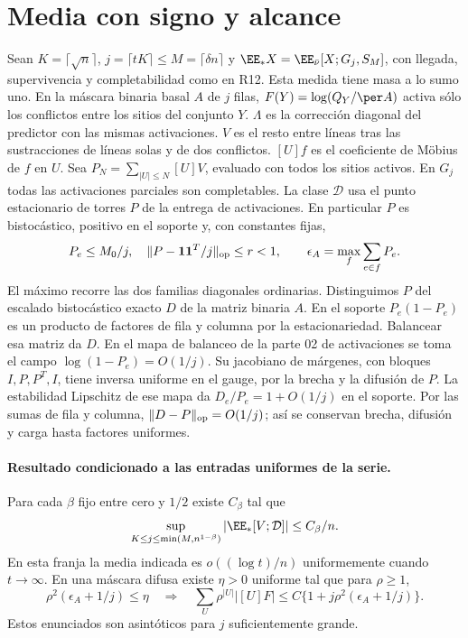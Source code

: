 \section{Media con signo y alcance}
Sean $K=\lceil\sqrt n\rceil$, $j=\lceil tK\rceil\le M=\lceil\delta n\rceil$ y
$\EE_*X=\EE_{\bar\nu}[X;G_j,S_M]$, con llegada, supervivencia y completabilidad como en R12.
Esta medida tiene masa a lo sumo uno. En la máscara binaria basal $A$ de $j$ filas,
$F(Y)=\log(Q_Y/\per A)$ activa sólo los conflictos entre los sitios del conjunto $Y$.
$\Lambda$ es la corrección diagonal del predictor con las mismas activaciones.
$V$ es el resto entre líneas tras las sustracciones de líneas solas y de dos conflictos.
$[U]f$ es el coeficiente de Möbius de $f$ en $U$. Sea
$P_N=\sum_{|U|\le N}[U]V$, evaluado con todos los sitios activos.
En $G_j$ todas las activaciones parciales son completables.
La clase $\mathcal D$ usa el punto estacionario de torres $P$ de la entrega de activaciones.
En particular $P$ es bistocástico, positivo en el soporte y, con constantes fijas,
\[
 P_e\le M_0/j,\quad \|P-\mathbf1\mathbf1^T/j\|_{\rm op}\le r<1,\qquad
 \epsilon_A=\max_f\sum_{e\in f}P_e .
\]
El máximo recorre las dos familias diagonales ordinarias. Distinguimos $P$ del escalado
bistocástico exacto $D$ de la matriz binaria $A$. En el soporte $P_e(1-P_e)$ es un
producto de factores de fila y columna por la estacionariedad. Balancear esa matriz da
$D$. En el mapa de balanceo de la parte 02 de activaciones se toma el campo
$\log(1-P_e)=O(1/j)$. Su jacobiano de márgenes, con bloques $I,P,P^T,I$, tiene inversa
uniforme en el gauge, por la brecha y la difusión de $P$. La estabilidad Lipschitz
de ese mapa da $D_e/P_e=1+O(1/j)$ en el soporte. Por las sumas de fila y columna,
$\|D-P\|_{\rm op}=O(1/j)$; así se conservan brecha, difusión y carga hasta factores uniformes.
\paragraph{Resultado condicionado a las entradas uniformes de la serie.}
Para cada $\beta$ fijo entre cero y $1/2$ existe $C_\beta$ tal que
\[
 \sup_{K\le j\le \min(M,n^{1-\beta})}|\EE_*[V;\mathcal D]|\le C_\beta/n .
\]
En esta franja la media indicada es $o((\log t)/n)$ uniformemente cuando $t\to\infty$.
En una máscara difusa existe $\eta>0$ uniforme tal que para $\rho\ge1$,
\[
 \rho^2(\epsilon_A+1/j)\le\eta\quad\Longrightarrow\quad
 \sum_U\rho^{|U|}|[U]F|\le C\{1+j\rho^2(\epsilon_A+1/j)\}.
\]
Estos enunciados son asintóticos para $j$ suficientemente grande.
